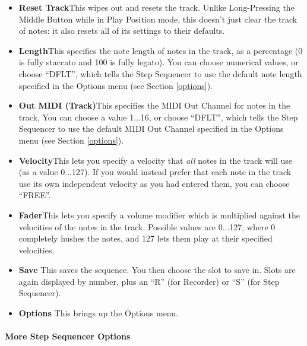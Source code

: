 \documentclass{article}
\begin{document}
\begin{itemize}
\item {\bf Reset Track}\quad This wipes out and resets the track.  Unlike Long-Pressing the Middle Button while in Play Position mode, this doesn't just clear the track of notes: it also resets all of its settings to their defaults.
\item {\bf Length}\quad This specifies the note length of notes in the track, as a percentage (0 is fully staccato and 100 is fully legato).   You can choose numerical values, or choose ``DFLT'', which tells the Step Sequencer to use the default note length specified in the Options menu (see Section \ref{options}).
\item {\bf Out MIDI (Track)}\quad This specifies the MIDI Out Channel for notes in the track,    You can choose a value 1...16, or choose ``DFLT'', which tells the Step Sequencer to use the default MIDI Out Channel specified in the Options menu (see Section \ref{options}).
\item {\bf Velocity}\quad This lets you specify a velocity that {\it all} notes in the track will use (as a value 0...127).  If you would instead prefer that each note in the track use its own independent velocity as you had entered them, you can choose ``FREE''.
\item {\bf Fader}\quad This lets you specify a volume modifier which is multiplied against the velocities of the notes in the track.  Possible values are 0...127, where 0 completely hushes the notes, and 127 lets them play at their specified velocities. 

\item {\bf Save} \quad This saves the sequence. You then choose the slot to save in.  Slots are again displayed by number, plus an ``R'' (for Recorder) or ``S'' (for Step Sequencer).
\item {\bf Options} \quad This brings up the Options menu.
\end{itemize}

\paragraph{More Step Sequencer Options}
\end{document}
